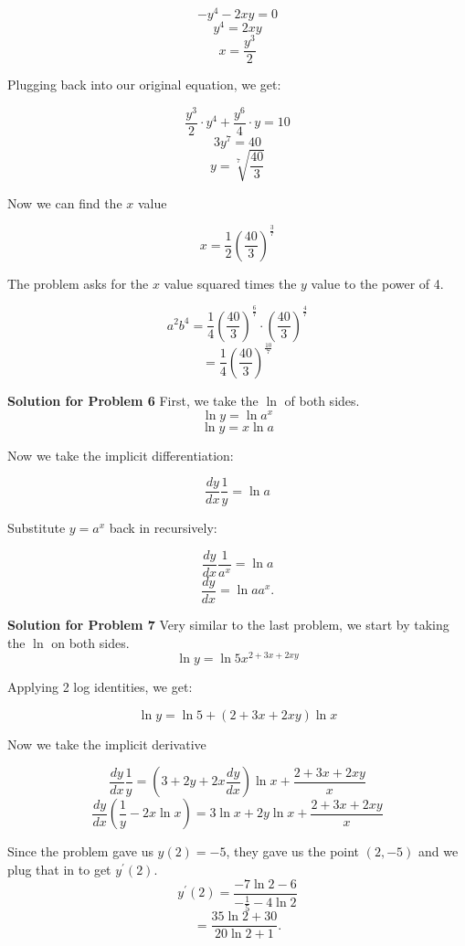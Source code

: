\documentclass{article}
\newcommand \der {\frac {dy} {dx}}
\begin{document}
\[-y^4 - 2xy = 0\]
\[y^4 = 2xy\]
\[x = \frac {y^3} {2}\]

Plugging back into our original equation, we get:

\[ \frac {y^3} {2} \cdot y^4 + \frac {y^6} {4} \cdot y = 10 \]
\[ 3y^7 = 40 \]
\[ y = \sqrt[7]{\frac {40} {3}} \]

Now we can find the $x$ value

\[ x = \frac {1} {2} \left( \frac {40} {3} \right)^{\frac {3} {7}} \]

The problem asks for the $x$ value squared times the $y$ value to the power of 4.

\[ a^2b^4 = \frac {1} {4} \left( \frac {40} {3} \right)^{\frac {6} {7}} \cdot \left( \frac {40} {3} \right)^{\frac {4} {7}} \]
\[ = \frac {1} {4} \left( \frac {40} {3} \right)^{\frac {10} {7}} \]

\vspace{1cm}

\newpage

\textbf{Solution for Problem 6} First, we take the $\ln$ of both sides. \\

\[ \ln{y} = \ln{a^x} \]
\[ \ln{y} = x\ln{a} \]

Now we take the implicit differentiation:

\[ \der \frac {1} {y} = \ln{a} \]

Substitute $y = a^x$ back in recursively:

\[ \der \frac {1} {a^x} = \ln{a} \]
\[ \der = \ln{a}a^x. \]

\vspace{1cm}

\textbf{Solution for Problem 7} Very similar to the last problem, we start by taking the $\ln$ on both sides.\\

\[ \ln{y} =  \ln{5x^{2 + 3x + 2xy}} \]

Applying 2 log identities, we get: 

\[ \ln{y} = \ln{5} + \left( 2 + 3x + 2xy \right)\ln{x} \]

Now we take the implicit derivative

\[ \der \frac {1} {y} = \left( 3 + 2y + 2x\der \right)\ln{x} + \dfrac {2 + 3x + 2xy} {x} \]
\[ \der \left( \frac {1} {y} - 2x\ln{x} \right) = 3\ln{x} + 2y\ln{x} + \dfrac {2 + 3x + 2xy} {x} \]

Since the problem gave us $y(2) = -5$, they gave us the point $\left( 2, -5 \right)$ and we plug that in to get $y^{\prime}(2)$.
\[ y^{\prime}(2) = \dfrac {-7\ln{2} - 6} {-\frac {1} {5} - 4\ln{2}} \]
\[ = \boxed{\dfrac {35\ln{2} + 30} {20\ln{2} + 1}}. \]
\end{document}
